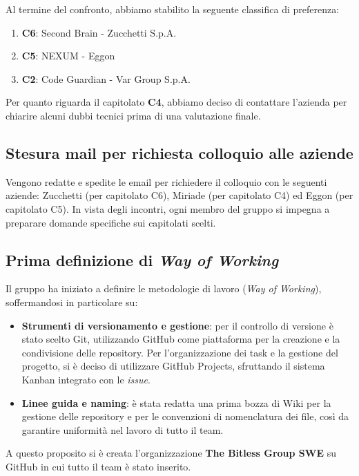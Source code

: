 \documentclass[a4paper, 10pt, colorlinks=true, linkcolor=black, urlcolor=blue, citecolor=blue, hidelinks]{article}
\begin{document}
Al termine del confronto, abbiamo stabilito la seguente classifica di preferenza:
\begin{enumerate}
    \item \textbf{C6}: Second Brain - Zucchetti S.p.A.
    \item \textbf{C5}: NEXUM - Eggon
    \item \textbf{C2}: Code Guardian - Var Group S.p.A.
\end{enumerate}
Per quanto riguarda il capitolato \textbf{C4}, abbiamo deciso di contattare l'azienda per chiarire alcuni dubbi tecnici prima di una valutazione finale.

\subsection{Stesura mail per richiesta colloquio alle aziende}
Vengono redatte e spedite le email per richiedere il colloquio con le seguenti aziende: Zucchetti (per capitolato C6), Miriade (per capitolato C4) ed Eggon (per capitolato C5). In vista degli incontri, ogni membro del gruppo si impegna a preparare domande specifiche sui capitolati scelti.

\subsection{Prima definizione di \textit{Way of Working}}
Il gruppo ha iniziato a definire le metodologie di lavoro (\textit{Way of Working}), soffermandosi in particolare su:
\begin{itemize}
    \item \textbf{Strumenti di versionamento e gestione}: per il controllo di versione è stato scelto Git, utilizzando GitHub come piattaforma per la creazione e la condivisione delle repository. Per l'organizzazione dei task e la gestione del progetto, si è deciso di utilizzare GitHub Projects, sfruttando il sistema Kanban integrato con le \textit{issue}.
    \item \textbf{Linee guida e naming}: è stata redatta una prima bozza di Wiki per la gestione delle repository e per le convenzioni di nomenclatura dei file, così da garantire uniformità nel lavoro di tutto il team.
\end{itemize}

A questo proposito si è creata l'organizzazione \textbf{The Bitless Group SWE} su GitHub in cui tutto il team è stato inserito.
\end{document}
